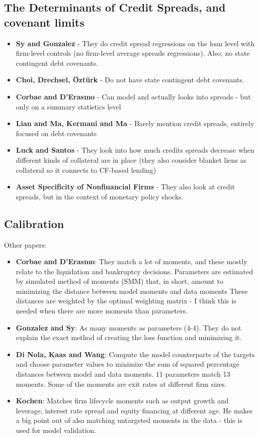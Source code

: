 \documentclass[12pt]{article}
\begin{document}
\subsection*{The Determinants of Credit Spreads, and covenant limits}
\begin{itemize}\setlength\itemsep{0em} \small
    \item \textbf{Sy and Gonzalez} - They do credit spread regressions on the loan level with firm-level controls (no firm-level average spreads regressions). Also, no state contingent debt covenants.
    \item \textbf{Choi, Drechsel, Öztürk} - Do not have state contingent debt covenants.
    \item \textbf{Corbae and D'Erasmo} - Can model and actually looks into spreads - but only on a summary statistics level
    \item \textbf{Lian and Ma, Kermani and Ma} - Barely mention credit spreads, entirely focused on debt covenants 
    \item \textbf{Luck and Santos} - They look into how much credits spreads decrease when different kinds of collateral are in place (they also consider blanket liens as collateral so it connects to CF-based lending)
    \item \textbf{Asset Specificity of Nonfinancial Firms} - They also look at credit spreads, but in the context of monetary policy shocks.
\end{itemize} \normalsize

\newpage

\subsection*{Calibration}

Other papers: 
\begin{itemize}\setlength\itemsep{0em} \small
    \item \textbf{Corbae and D'Erasmo}: They match a lot of moments, and these mostly relate to the liquidation and bankruptcy decisions. Parameters are estimated by simulated method of moments (SMM) that, in short, amount to minimizing the distance between model moments and data moments These distances are weighted by the optimal weighting matrix - I think this is needed when there are more moments than parameters. 
    \item \textbf{Gonzalez and Sy}: As many moments as parameters (4-4). They do not explain the exact method of creating the loss function and minimizing it.
    \item \textbf{Di Nola, Kaas and Wang}: Compute the model counterparts of the targets and choose parameter values to minimize the sum of squared percentage distances between model and data moments. 11 parameters match 13 moments. Some of the moments are exit rates at different firm sizes.
    \item \textbf{Kochen}: Matches firm lifecycle moments  such as output growth and leverage, interest rate spread and equity financing at different age. He makes a big point out of also matching untargeted moments in the data - this is used for model validation. 
\end{itemize} \normalsize
\end{document}
